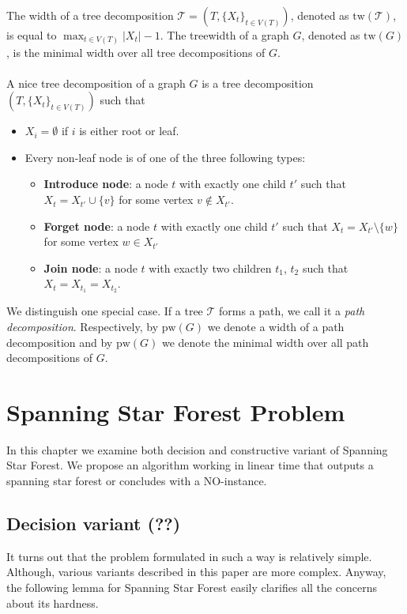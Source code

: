 \documentclass[en]{pracamgr}
\newcommand{\ssf}{spanning star forest}
\newcommand{\ssfp}{{\sc Spanning Star Forest}}
\begin{document}
The width of a tree decomposition $\mathcal{T} = (T,\{X_t\}_{t\in V(T)})$, denoted as $\textrm{tw}(\mathcal{T})$, is equal to $\max_{t \in V(T)} |X_t| - 1$. The treewidth of a graph $G$, denoted as $\textrm{tw}(G)$, is the minimal width over all tree decompositions of $G$.
\\\\
A nice tree decomposition of a graph $G$ is a tree decomposition $(T, \{X_t\}_{t \in V(T)})$ such that
\begin{itemize}
	\item $X_i = \emptyset$ if $i$ is either root or leaf.
	\item Every non-leaf node is of one of the three following types:
	\begin{itemize}
		\item \textbf{Introduce node}: a node $t$ with exactly one child $t'$ such that $X_t = X_{t'} \cup \{v\}$ for some vertex $v \notin X_{t'}$.
		\item \textbf{Forget node}: a node $t$ with exactly one child $t'$ such that $X_t = X_{t'} \setminus \{w\}$ for some vertex $w \in X_{t'}$
		\item \textbf{Join node}: a node $t$ with exactly two children $t_1$, $t_2$ such that $X_t = X_{t_1} = X_{t_2}$.
	\end{itemize}
\end{itemize}

We distinguish one special case. If a tree $\mathcal{T}$ forms a path, we call it a \emph{path decomposition}. Respectively, by $\textrm{pw}(G)$ we denote a width of a path decomposition and by $\textrm{pw}(G)$ we denote the minimal width over all path decompositions of $G$.

\chapter{Spanning Star Forest Problem}

In this chapter we examine both decision and constructive variant of \ssfp{}. We propose an algorithm working in linear time that outputs a \ssf{} or concludes with a NO-instance.

\section{Decision variant (??)}

It turns out that the problem formulated in such a way is relatively simple. Although, various variants described in this paper are more complex. Anyway, the following lemma for \ssfp{} easily clarifies all the concerns about its hardness.
\end{document}
